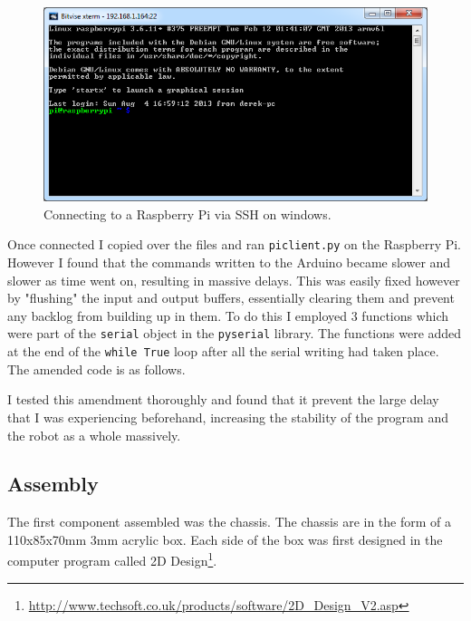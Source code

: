 \documentclass[]{report}   %
\begin{document}
						\begin{figure}[h]
							\caption{Connecting to a Raspberry Pi via SSH on windows.}
							\includegraphics[width=\textwidth,height=\textheight,keepaspectratio]{images/ssh}
						\end{figure}
						
						Once connected I copied over the files and ran \lstinline{piclient.py} on the Raspberry Pi. However I found that the commands written to
						the Arduino became slower and slower as time went on, resulting in massive delays. This was easily fixed however by "flushing" the input
						and output buffers, essentially clearing them and prevent any backlog from building up in them. To do this I employed 3 functions which
						were part of the \lstinline{serial} object in the \lstinline{pyserial} library. The functions were added at the end of the
						\lstinline{while True} loop after all the serial writing had taken place. The amended code is as follows.
						
						
						
						I tested this amendment thoroughly and found that it prevent the large delay that I was experiencing beforehand, increasing the stability
						of the program and the robot as a whole massively.
						
					\subsection{Assembly}
				The first component assembled was the chassis. The chassis are in the form of a 110x85x70mm 3mm acrylic box. Each side of the box was first
				designed in the computer program called 2D Design\footnote{\url{http://www.techsoft.co.uk/products/software/2D_Design_V2.asp}}. 
					
\end{document}
